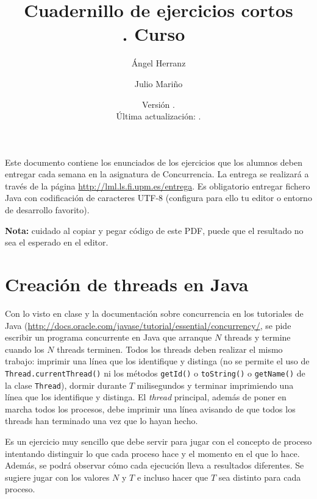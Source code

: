 \documentclass{article}
\title{
  Cuadernillo de ejercicios cortos\\
  \asignatura.
  Curso~\curso
}
\author{Ángel Herranz \and Julio Mariño}
\date{Versión \svnrev.\\Última actualización: \svndate.}
\begin{document}
\pagestyle{fancy}
\chead{\asignatura}
\rhead{\convocatoria\ \curso}
\lfoot{}
\cfoot{\thepage}
\rfoot{}

\maketitle

\noindent
Este documento contiene los enunciados de los ejercicios que los
alumnos deben entregar cada semana en la asignatura de Concurrencia.
La entrega se realizará a través de la página
\url{http://lml.ls.fi.upm.es/entrega}. Es obligatorio entregar fichero
Java con codificación de caracteres UTF-8 (configura para ello tu
editor o entorno de desarrollo favorito).

\noindent\textbf{Nota:} cuidado al copiar y pegar código de este PDF,
puede que el resultado no sea el esperado en el editor.

\tableofcontents


\clearpage
\section{Creación de threads en Java}
Con lo visto en clase y la documentación sobre concurrencia en los
tutoriales de Java
(\url{http://docs.oracle.com/javase/tutorial/essential/concurrency/},
se pide escribir un programa concurrente en Java que arranque $N$
threads y termine cuando los $N$ threads terminen. Todos los threads
deben realizar el mismo trabajo: imprimir una línea que los
identifique y distinga (no se permite el uso de
\lstinline{Thread.currentThread()} ni los métodos \lstinline{getId()}
o \lstinline{toString()} o \lstinline{getName()} de la clase
\lstinline{Thread}), dormir durante $T$ milisegundos y terminar
imprimiendo una línea que los identifique y distinga. El \emph{thread}
principal, además de poner en marcha todos los procesos, debe imprimir
una línea avisando de que todos los threads han terminado una vez que
lo hayan hecho.

Es un ejercicio muy sencillo que debe servir para jugar con el
concepto de proceso intentando distinguir lo que cada proceso hace y
el momento en el que lo hace. Además, se podrá observar cómo cada
ejecución lleva a resultados diferentes. Se sugiere jugar con los
valores $N$ y $T$ e incluso hacer que $T$ sea distinto para cada
proceso.
\end{document}
